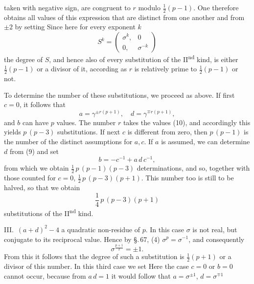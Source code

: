 taken with negative sign, are congruent to $r$ modulo $\frac{1}{2}(p-1)$.
One therefore obtains all values of this expression that are distinct
from one another and from $\pm 2$ by setting
Since here for every exponent $k$
\[
S^k = \begin{pmatrix} \sigma^k, & 0 \\ 0, & \sigma^{-k} \end{pmatrix}
\]
the degree of $S$, and hence also of every substitution of the
II\textsuperscript{nd} kind, is either $\frac{1}{2}(p-1)$ or a divisor of it, according
as $r$ is relatively prime to $\frac{1}{2}(p-1)$ or not.

To determine the number of these substitutions, we proceed
as above. If first $c = 0$, it follows that
\[
a = \gamma^{\pm r(p+1)}, \quad d = \gamma^{\mp r(p+1)},
\]
and $b$ can have $p$ values. The number $r$ takes the values (10),
and accordingly this yields $p\,(p-3)$ substitutions. If next
$c$ is different from zero, then $p\,(p-1)$ is the number of the
distinct assumptions for $a, c$. If $a$ is assumed, we can
determine $d$ from (9) and set
\[
b = -c^{-1} + a\,d\,c^{-1},
\]
from which we obtain $\frac{1}{2}\,p\,(p-1)(p-3)$ determinations,
and so, together with those counted for $c = 0$, $\frac{1}{2}\,p\,(p-3)(p+1)$.
This number too is still to be halved, so that we obtain
\[
\frac{1}{4}\,p\,(p-3)(p+1)
\]
substitutions of the II\textsuperscript{nd} kind.

III.~$(a+d)^2 - 4$ a quadratic non-residue of $p$. In this
case $\sigma$ is not real, but conjugate to its reciprocal value.
Hence by \S.\,67, (4) $\sigma^p = \sigma^{-1}$, and consequently
\[
\sigma^{\frac{p+1}{2}} = \pm 1.
\]
From this it follows that the degree of such a substitution
is $\frac{1}{2}(p+1)$ or a divisor of this number.
In this third case we set
Here the case $c = 0$ or $b = 0$ cannot occur, because
from $a\,d = 1$ it would follow that $a = \sigma^{\pm 1}$, $d = \sigma^{\mp 1}$
